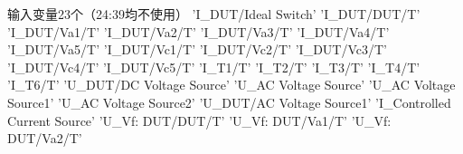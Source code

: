 \documentclass{article}
\begin{document}
\indent 输入变量23个（24:39均不使用）\newline{}   {      'I\_DUT/Ideal Switch'         }   {      'I\_DUT/DUT/T'                }   {      'I\_DUT/Va1/T'                }   {      'I\_DUT/Va2/T'                }   {      'I\_DUT/Va3/T'                }   {      'I\_DUT/Va4/T'                }   {      'I\_DUT/Va5/T'                }   {      'I\_DUT/Vc1/T'                }   {      'I\_DUT/Vc2/T'                }  {      'I\_DUT/Vc3/T'                }  {      'I\_DUT/Vc4/T'                }  {      'I\_DUT/Vc5/T'                }  {      'I\_T1/T'                     }  {      'I\_T2/T'                     }  {      'I\_T3/T'                     }  {      'I\_T4/T'                     }  {      'I\_T6/T'                     }  {      'U\_DUT/DC Voltage Source'    }  {      'U\_AC Voltage Source'        }  {      'U\_AC Voltage Source1'       }  {      'U\_AC Voltage Source2'       }  {      'U\_DUT/AC Voltage Source1'   }  {      'I\_Controlled Current Source'}  {      'U\_Vf: DUT/DUT/T'            }  {      'U\_Vf: DUT/Va1/T'            }  {      'U\_Vf: DUT/Va2/T'            }\newline
\end{document}
